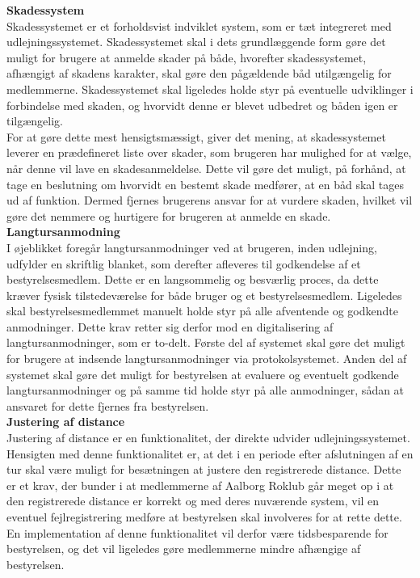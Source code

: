 \textbf{Skadessystem}\\
Skadessystemet er et forholdsvist indviklet system, som er tæt integreret med udlejningssystemet. Skadessystemet skal i dets grundlæggende form gøre det muligt for brugere at anmelde skader på både, hvorefter skadessystemet, afhængigt af skadens karakter, skal gøre den pågældende båd utilgængelig for medlemmerne. Skadessystemet skal ligeledes holde styr på eventuelle udviklinger i forbindelse med skaden, og hvorvidt denne er blevet udbedret og båden igen er tilgængelig.\\

For at gøre dette mest hensigtsmæssigt, giver det mening, at skadessystemet leverer en prædefineret liste over skader, som brugeren har mulighed for at vælge, når denne vil lave en skadesanmeldelse. Dette vil gøre det muligt, på forhånd, at tage en beslutning om hvorvidt en bestemt skade medfører, at en båd skal tages ud af funktion. Dermed fjernes brugerens ansvar for at vurdere skaden, hvilket vil gøre det nemmere og hurtigere for brugeren at anmelde en skade.\\

\textbf{Langtursanmodning}\\
I øjeblikket foregår langtursanmodninger ved at brugeren, inden udlejning, udfylder en skriftlig blanket, som derefter afleveres til godkendelse af et bestyrelsesmedlem. Dette er en langsommelig og besværlig proces, da dette kræver fysisk tilstedeværelse for både bruger og et bestyrelsesmedlem. Ligeledes skal bestyrelsesmedlemmet manuelt holde styr på alle afventende og godkendte anmodninger. Dette krav retter sig derfor mod en digitalisering af langtursanmodninger, som er to-delt. Første del af systemet skal gøre det muligt for brugere at indsende langtursanmodninger via protokolsystemet. Anden del af systemet skal gøre det muligt for bestyrelsen at evaluere og eventuelt godkende langtursanmodninger og på samme tid holde styr på alle anmodninger, sådan at ansvaret for dette fjernes fra bestyrelsen.\\

\textbf{Justering af distance}\\
Justering af distance er en funktionalitet, der direkte udvider udlejningssystemet. Hensigten med denne funktionalitet er, at det i en periode efter afslutningen af en tur skal være muligt for besætningen at justere den registrerede distance. Dette er et krav, der bunder i at medlemmerne af Aalborg Roklub går meget op i at den registrerede distance er korrekt og med deres nuværende system, vil en eventuel fejlregistrering medføre at bestyrelsen skal involveres for at rette dette.
En implementation af denne funktionalitet vil derfor være tidsbesparende for bestyrelsen, og det vil ligeledes gøre medlemmerne mindre afhængige af bestyrelsen.\\

